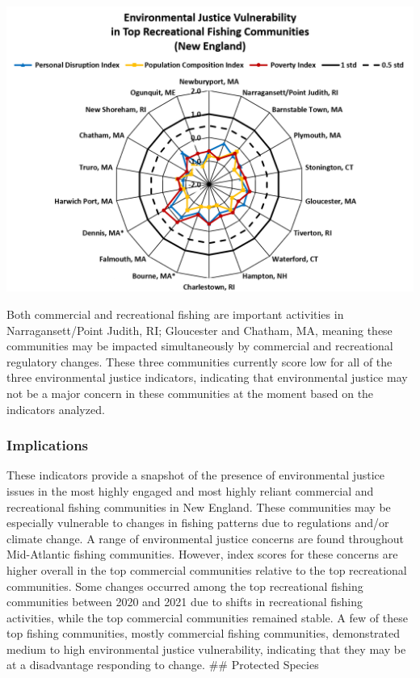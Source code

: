 \documentclass[
  10pt,
]{article}
\let\origfigure\figure
\let\endorigfigure\endfigure
\renewenvironment{figure}[1][2] {
    \expandafter\origfigure\expandafter[H]
} {
    \endorigfigure
}
\begin{document}
\begin{figure}

{\centering \includegraphics[width=0.75\linewidth]{SOE-NEFMC_files/figure-latex/recreational-EJ-1} 

}

\caption{Environmental justice indicators (Poverty Index, population composition index, and personal disruption index) for top recreational fishing communities in New England. *Community scored high (1.00 and above) for both commercial engagement and reliance indicators.}\label{fig:recreational-EJ}
\end{figure}

Both commercial and recreational fishing are important activities in Narragansett/Point Judith, RI; Gloucester and Chatham, MA, meaning these communities may be impacted simultaneously by commercial and recreational regulatory changes. These three communities currently score low for all of the three environmental justice indicators, indicating that environmental justice may not be a major concern in these communities at the moment based on the indicators analyzed.

\hypertarget{implications-4}{%
\subsubsection{Implications}\label{implications-4}}

These indicators provide a snapshot of the presence of environmental justice issues in the most highly engaged and most highly reliant commercial and recreational fishing communities in New England. These communities may be especially vulnerable to changes in fishing patterns due to regulations and/or climate change. A range of environmental justice concerns are found throughout Mid-Atlantic fishing communities. However, index scores for these concerns are higher overall in the top commercial communities relative to the top recreational communities. Some changes occurred among the top recreational fishing communities between 2020 and 2021 due to shifts in recreational fishing activities, while the top commercial communities remained stable. A few of these top fishing communities, mostly commercial fishing communities, demonstrated medium to high environmental justice vulnerability, indicating that they may be at a disadvantage responding to change.
\#\# Protected Species
\end{document}
